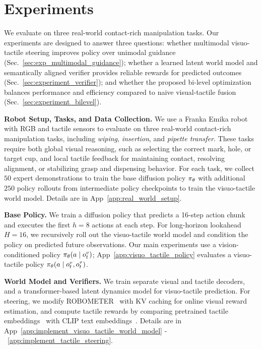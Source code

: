 
\section{Experiments}
\label{sec:experiments}
We evaluate \ours on three real-world contact-rich manipulation tasks. 
Our experiments are designed to answer three questions: whether multimodal visuo-tactile steering improves policy over unimodal guidance (Sec.~\ref{sec:exp_multimodal_guidance}); whether a learned latent world model and semantically aligned verifier provides reliable rewards for predicted outcomes (Sec.~\ref{sec:experiment_verifier}); and whether the proposed bi-level optimization balances performance and efficiency compared to naive visual-tactile fusion (Sec.~\ref{sec:experiment_bilevel}).


\textbf{Robot Setup, Tasks, and Data Collection.}
We use a Franka Emika robot with RGB and tactile sensors to evaluate \ours on three real-world contact-rich manipulation tasks, including \textit{wiping}, \textit{insertion}, and \textit{pipette transfer}. These tasks require both global visual reasoning, such as selecting the correct mark, hole, or target cup, and local tactile feedback for maintaining contact, resolving alignment, or stabilizing grasp and dispensing behavior. 
 For each task, we collect $50$ expert demonstrations to train the base diffusion policy $\pi_{\theta}$ with additional $250$ policy rollouts from intermediate policy checkpoints to train the visuo-tactile world model.  Details are in App~\ref{app:real_world_setup}.



\textbf{Base Policy.}
We train a diffusion policy that predicts a 16-step action chunk and executes the first $h=8$ actions at each step. For long-horizon lookahead $H=16$, we recursively roll out the visuo-tactile world model and condition the policy on predicted future observations. Our main experiments use a vision-conditioned policy $\pi_\theta(a \mid o^v_t)$; App~\ref{app:visuo_tactile_policy} evaluates a visuo-tactile policy $\pi_\theta(a \mid o^v_t,o^\tau_t)$.




\textbf{World Model and Verifiers.}
We train separate visual and tactile decoders, and a transformer-based latent dynamics model for visuo-tactile prediction. For steering, we modify ROBOMETER~\cite{liang2026robometer} with KV caching for online visual reward estimation, and compute tactile rewards by comparing pretrained tactile embeddings~\cite{fenganytouch2} with CLIP text embeddings~\cite{radford2021learning}. Details are in App~\ref{app:implement_visuo_tactile_world_model} -~\ref{app:implement_tactile_steering}.



